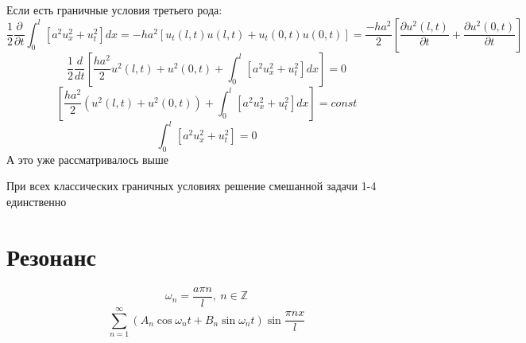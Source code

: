 \documentclass[a4paper]{article}
\begin{document}
Если есть граничные условия третьего рода:
\[
    \frac{1}{2} \frac{\partial}{\partial t} \int_{0}^{l} [a^2u^2_x + u_t^2]dx =
    -ha^2 [u_t(l,t)u(l,t) + u_t(0,t)u(0,t)] = \frac{-ha^2}{2} \left[ \frac{\partial 
    u^2(l,t)}{\partial t} + \frac{\partial u^2(0,t)}{\partial t} \right]
\]
\[
    \frac{1}{2} \frac{d}{dt} \left[ \frac{ha^2}{2} u^2(l,t) + u^2(0,t) + \int_{
    0}^{l} [ a^2 u_x^2 + u_t^2] dx \right] = 0
\]
\[
    \left[ \frac{ha^2}{2} (u^2(l,t) + u^2(0,t)) + \int_{
    0}^{l} [ a^2 u_x^2 + u_t^2] dx \right] = const
\]
\[
    \int_{ 0}^{l} [ a^2 u_x^2 + u_t^2] = 0
\]
А это уже рассматривалось выше

При всех классических граничных условиях решение смешанной задачи 1-4 единственно

\section*{\centering Резонанс}
\[
    \omega_n = \frac{a\pi n}{l}, \ n \in \mathbb{Z}
\]
\[
    \sum_{n=1}^{\infty} (A_n \cos\omega_n t + B_n\sin \omega_n t) \sin \frac{\pi
    n x}{l} 
\]
\end{document}
